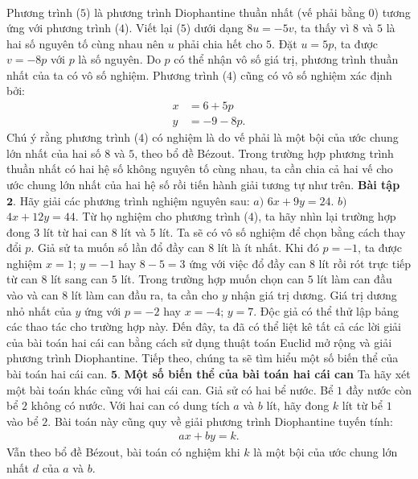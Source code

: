 \begin{multicols}{2}
\begin{align*}
	\end{align*}
	Phương trình ($5$) là phương trình Diophantine thuần nhất (vế phải bằng $0$) tương ứng với phương trình ($4$). Viết lại ($5$) dưới dạng $8u=-5v$, ta thấy vì $8$ và $5$ là hai số nguyên tố cùng nhau nên $u$ phải chia hết cho $5$. Đặt $u=5p$, ta được $v=-8p$ với $p$ là số nguyên. Do $p$ có thể nhận vô số giá trị, phương trình thuần nhất của ta có vô số nghiệm. 
	\vskip 0.1cm
	Phương trình ($4$) cũng có vô số nghiệm xác định bởi: 
	\begin{align*}
		x&=6+5p\\
		y&=-9-8p.
	\end{align*}
	Chú ý rằng phương trình ($4$) có nghiệm là do vế phải là một bội của ước chung lớn nhất của hai số $8$ và $5$, theo bổ đề Bézout. Trong trường hợp phương trình thuần nhất có hai hệ số không nguyên tố cùng nhau, ta cần chia cả hai vế cho ước chung lớn nhất của hai hệ số rồi tiến hành giải tương tự như trên.
	\vskip 0.1cm
	\textbf{\color{hoccungpi}Bài tập $\pmb{2.}$}
	Hãy giải các phương trình nghiệm nguyên sau:
	\vskip 0.1cm
	$a)$ $6x+9y=24$.
	\vskip 0.1cm
	$b)$ $4x+12y=44$.
	\vskip 0.1cm
	Từ họ nghiệm cho phương trình ($4$), ta hãy nhìn lại trường hợp đong $3$ lít từ hai can $8$ lít và $5$ lít. Ta sẽ có vô số nghiệm để chọn bằng cách thay đổi $p$. Giả sử ta muốn số lần đổ đầy can $8$ lít là ít nhất. Khi đó $p=-1$, ta được nghiệm $x=1$; $y=-1$ hay $8-5=3$ ứng với việc đổ đầy can $8$ lít rồi rót trực tiếp từ can $8$ lít sang can $5$ lít. Trong trường hợp muốn chọn can $5$ lít làm can đầu vào và can $8$ lít làm can đầu ra, ta cần cho $y$ nhận giá trị dương. Giá trị dương nhỏ nhất của $y$ ứng với $p=-2$ hay $x=-4$; $y=7$. Độc giả có thể thử lập bảng các thao tác cho trường hợp này.
	\vskip 0.1cm
	Đến đây, ta đã có thể liệt kê tất cả các lời giải của bài toán hai cái can bằng cách sử dụng thuật toán Euclid mở rộng và giải phương trình Diophantine. Tiếp theo, chúng ta sẽ tìm hiểu một số biến thể của bài toán hai cái can.
	\vskip 0.1cm
	$\pmb{5.}$ \textbf{\color{hoccungpi}Một số biến thể của bài toán hai cái can}
	\vskip 0.1cm 
	Ta hãy xét một bài toán khác cũng với hai cái can. 
	\vskip 0.1cm
	Giả sử có hai bể nước. Bể $1$ đầy nước còn bể $2$ không có nước. Với hai can có dung tích $a$ và $b$ lít, hãy đong $k$ lít từ bể $1$ vào bể $2$.
	\vskip 0.1cm
	Bài toán này cũng quy về giải phương trình Diophantine tuyến tính:
	\begin{align*}
		ax+by=k.
	\end{align*}
	Vẫn theo bổ đề Bézout, bài toán có nghiệm khi $k$ là một bội của ước chung lớn nhất $d$ của $a$ và $b$.

\end{multicols}
